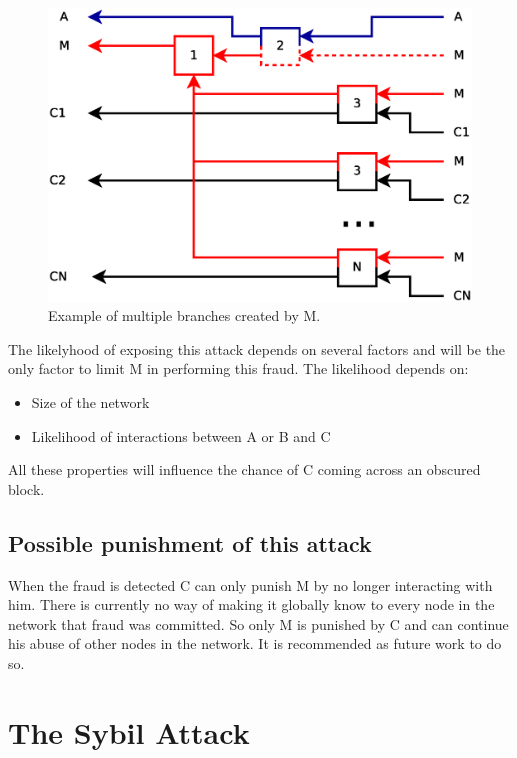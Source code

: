 \begin{figure}
	\centerline{\includegraphics[scale=0.3]{problems/figs/branch-multiple.eps}}
	\caption{Example of multiple branches created by M.}
	\label{fig:branch-multiple}
\end{figure}



The likelyhood of exposing this attack depends on several factors
and will be the only factor to limit M in performing this fraud.
The likelihood depends on:
\begin{itemize}
\item Size of the network
\item Likelihood of interactions between A or B and C
\end{itemize}

All these properties will influence the chance of C coming across an obscured block.

\subsection{Possible punishment of this attack}
When the fraud is detected C can only punish M by no longer interacting with him.
There is currently no way of making it globally know to every node in the network that fraud was committed.
So only M is punished by C and can continue his abuse of other nodes in the network.
It is recommended as future work to do so.

\section{The Sybil Attack}

